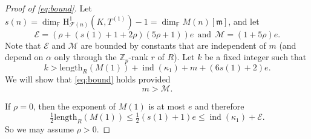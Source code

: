 \documentclass[a4paper,10pt]{amsart}
\numberwithin{equation}{section}
\numberwithin{equation}{section}
\theoremstyle{plain}
\theoremstyle{definition}
\theoremstyle{definition}
\theoremstyle{plain}
\theoremstyle{plain}
\theoremstyle{plain}
\theoremstyle{plain}
\DeclareMathOperator{\ord}{ord}
\newcommand{\ind}{\operatorname{ind}}
\newcommand{\Zp}{\mathbb{Z}_{p}}
\newcommand{\F}{\mathcal{F}}
\newcommand{\CE}{\mathcal{E}}
\newcommand{\CM}{\mathcal{M}}
\newcommand{\Fcal}{\mathcal{F}}
\newcommand{\kap}{\kappa}
\newcommand{\fm}{\mathfrak{m}}
\newcommand{\rH}{\mathrm{H}}
\begin{document}
\begin{proof}[Proof of \eqref{eq:bound}]
Let $s(n)= \dim_{\mathbb{F}}\rH^1_{\F(n)}(K,T^{(1)})-1 = \dim_\mathbb{F}M(n)[\fm]$, and let
\[
\CE = (\rho + (s(1) +1+ 2\rho)(5\rho+1))e \ \ \text{and} \ \ \CM = (1+5\rho)e.
\]
Note that $\CE$ and $\CM$ are bounded by constants that are independent of $m$ (and depend on $\alpha$ only through the $\Zp$-rank $r$ of $R$). 
Let $k$ be a fixed integer such that 
\begin{equation}\label{eq:kbig}
k > \mathrm{length}_{R}(M(1)) + \ind(\kap_1)+m + (6 s(1)+ 2) e.
\end{equation}
We will show that \eqref{eq:bound} holds provided 
$$
m > \CM.
$$

%

If $\rho = 0$, then the exponent of $M(1)$ is at most $e$ and therefore
\[
\tfrac{1}{2} \mathrm{length}_{R}(M(1)) \leq \tfrac{1}{2} (s(1)+1)e \leq \ind(\kappa_1) + \CE.
\]
So we may assume $\rho>0$. 
%
%
%


\end{proof}
\end{document}
